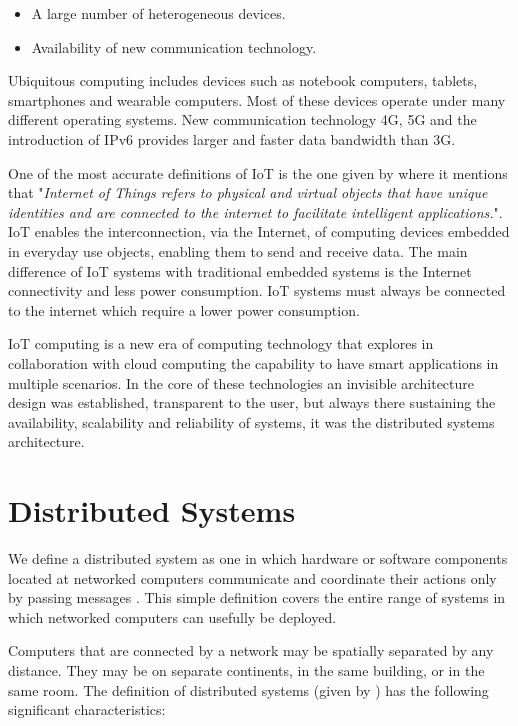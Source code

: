 \begin{itemize}
\item A large number of heterogeneous devices.
\item Availability of new communication technology.
\end{itemize}

Ubiquitous computing includes devices such as notebook computers, tablets, smartphones
and wearable computers. Most of these devices operate under many different
operating systems. New communication technology 4G, 5G and the introduction of
IPv6 provides larger and faster data bandwidth than 3G.

One of the most accurate definitions of IoT is the one given by \cite{Bahga}
where it mentions that "\textit{Internet of Things refers to physical and virtual
objects that have unique identities and are connected to the internet to
facilitate intelligent applications.}". IoT enables the interconnection, via the
Internet, of computing devices embedded in everyday use objects, enabling them
to send and receive data. The main difference of IoT systems with traditional
embedded systems is the Internet connectivity and less power consumption. IoT
systems must always be connected to the internet which require a lower power
consumption.

IoT computing is a new era of computing technology that explores in
collaboration with cloud computing the capability to have smart applications in
multiple scenarios. In the core of these technologies an invisible architecture
design was established, transparent to the user, but always there sustaining
the availability, scalability and reliability of systems, it was the
distributed systems architecture.

\section{Distributed Systems}
\noindent

We define a distributed system as one in which hardware or software components
located at networked computers communicate and coordinate their actions only by
passing messages \cite{Coulouris}. This simple definition covers the entire
range of systems in which networked computers can usefully be deployed.

Computers that are connected by a network may be spatially separated by any
distance. They may be on separate continents, in the same building, or in the
same room. The definition of distributed systems (given by \cite{Coulouris})
has the following significant characteristics:

